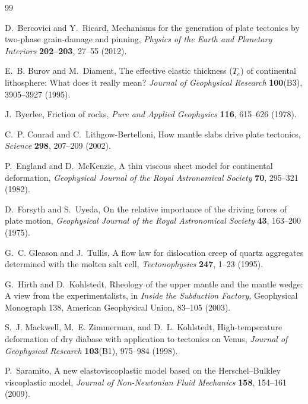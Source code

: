 \documentclass[11pt]{article}
\begin{document}
\begin{thebibliography}{99}

D.~Bercovici and Y.~Ricard,
Mechanisms for the generation of plate tectonics by two-phase grain-damage and
pinning,
\emph{Physics of the Earth and Planetary Interiors} \textbf{202--203}, 27--55 (2012).

E.~B. Burov and M.~Diament,
The effective elastic thickness ($T_e$) of continental lithosphere: What does it
really mean?
\emph{Journal of Geophysical Research} \textbf{100}(B3), 3905--3927 (1995).

J.~Byerlee,
Friction of rocks,
\emph{Pure and Applied Geophysics} \textbf{116}, 615--626 (1978).

C.~P. Conrad and C.~Lithgow-Bertelloni,
How mantle slabs drive plate tectonics,
\emph{Science} \textbf{298}, 207--209 (2002).

P.~England and D.~McKenzie,
A thin viscous sheet model for continental deformation,
\emph{Geophysical Journal of the Royal Astronomical Society} \textbf{70},
295--321 (1982).

D.~Forsyth and S.~Uyeda,
On the relative importance of the driving forces of plate motion,
\emph{Geophysical Journal of the Royal Astronomical Society} \textbf{43},
163--200 (1975).

G.~C. Gleason and J.~Tullis,
A flow law for dislocation creep of quartz aggregates determined with the molten
salt cell,
\emph{Tectonophysics} \textbf{247}, 1--23 (1995).

G.~Hirth and D.~Kohlstedt,
Rheology of the upper mantle and the mantle wedge: A view from the
experimentalists,
in \emph{Inside the Subduction Factory}, Geophysical Monograph 138, American
Geophysical Union, 83--105 (2003).

S.~J. Mackwell, M.~E. Zimmerman, and D.~L. Kohlstedt,
High-temperature deformation of dry diabase with application to tectonics on
Venus,
\emph{Journal of Geophysical Research} \textbf{103}(B1), 975--984 (1998).

P.~Saramito,
A new elastoviscoplastic model based on the Herschel--Bulkley viscoplastic
model,
\emph{Journal of Non-Newtonian Fluid Mechanics} \textbf{158}, 154--161 (2009).

\end{thebibliography}
\end{document}

